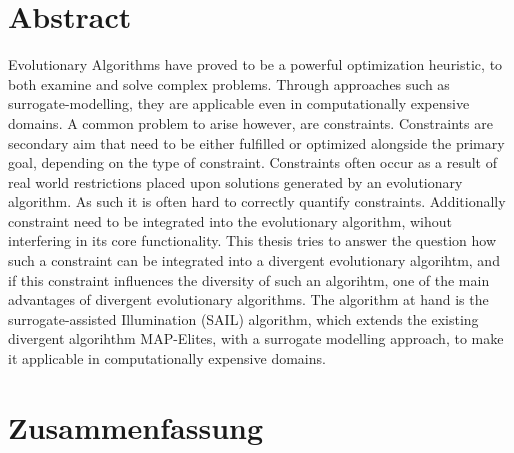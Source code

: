 
\clearpage
\section*{Abstract}
Evolutionary Algorithms have proved to be a powerful optimization heuristic, to both examine and solve complex problems.
Through approaches such as surrogate-modelling, they are applicable even in computationally expensive domains.
A common problem to arise however, are constraints.
Constraints are secondary aim that need to be either fulfilled or optimized alongside the primary goal, depending on the type of constraint.
Constraints often occur as a result of real world restrictions placed upon solutions generated by an evolutionary algorithm.
As such it is often hard to correctly quantify constraints.
Additionally constraint need to be integrated into the evolutionary algorithm, wihout interfering in its core functionality.
This thesis tries to answer the question how such a constraint can be integrated into a divergent evolutionary algorihtm, and if this constraint influences the diversity of such an algorihtm, one of the main advantages of divergent evolutionary algorithms.
The algorithm at hand is the surrogate-assisted Illumination (SAIL) algorithm, which extends the existing divergent algorihthm MAP-Elites, with a surrogate modelling approach, to make it applicable in computationally expensive domains.

\clearpage
\section*{Zusammenfassung}

